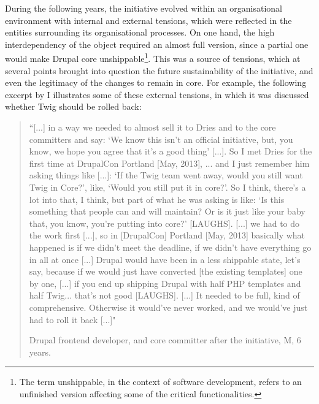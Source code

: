 During the following years, the initiative evolved within an organisational environment with internal and external tensions, which were reflected in the entities surrounding its organisational processes. On one hand, the high interdependency of the object required an almost full version, since a partial one would make Drupal core unshippable\footnote{The term unshippable, in the context of software development, refers to an unfinished version affecting some of the critical functionalities.}. This was a source of tensions, which at several points brought into question the future sustainability of the initiative, and even the legitimacy of the changes to remain in core. For example, the following excerpt by I illustrates some of these external tensions, in which it was discussed whether Twig should be rolled back:

\begin{quotation}
``[...] in a way we needed to almost sell it to Dries and to the core committers and say: `We know this isn't an official initiative, but, you know, we hope you agree that it's a good thing' [...]. So I met Dries for the first time at DrupalCon Portland [May, 2013], ... and I just remember him asking things like [...]: `If the Twig team went away, would you still want Twig in Core?', like, `Would you still put it in core?'. So I think, there's a lot into that, I think, but part of what he was asking is like: `Is this something that people can and will maintain? Or is it just like your baby that, you know, you're putting into core?' [LAUGHS]. [...] we had to do the work first [...], so in [DrupalCon] Portland [May, 2013] basically what happened is if we didn't meet the deadline, if we didn't have everything go in all at once [...] Drupal would have been in a less shippable state, let's say, because if we would just have converted [the existing templates] one by one, [...] if you end up shipping Drupal with half PHP templates and half Twig... that's not good [LAUGHS]. [...] It needed to be full, kind of comprehensive. Otherwise it would've never worked, and we would've just had to roll it back [...]"

\begin{flushright}\footnotesize{Drupal frontend developer, and core committer after the initiative, M, 6 years.}\end{flushright}
\end{quotation}

